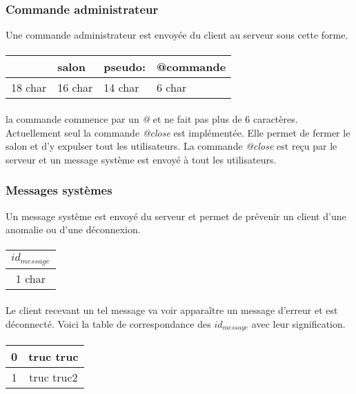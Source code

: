 \documentclass[a4paper, 12pt]{article}
\begin{document}
\subsubsection{Commande administrateur}
Une commande administrateur est envoyée du client au serveur sous cette forme.
\paragraph{}
\begin{tabular}{|p{2cm}|p{1.6cm}|p{1.5cm}|p{5cm}| }
 \hline			
   [hh:mm:ss] & salon & pseudo: & @commande \\
 \hline		
    18 char & 16 char & 14 char & 6 char \\
 \hline  
 \end{tabular}
 \paragraph{}
la commande commence par un \emph{@} et ne fait pas plus de 6 caractères.
Actuellement seul la commande \emph{@close} est implémentée. Elle permet de fermer le salon et d'y expulser tout les utilisateurs.
La commande \emph{@close} est reçu par le serveur et un message système est envoyé à tout les utilisateurs.
\subsubsection{Messages systèmes}
Un message système est envoyé du serveur et permet de prévenir un client d'une anomalie ou d'une déconnexion.
\paragraph{}
\begin{tabular}{|c|}
 \hline			
   $id_{message}$\\
 \hline		
    1 char \\
 \hline  
 \end{tabular}
\paragraph{}
Le client recevant un tel message va voir apparaître un message d'erreur et est déconnecté.
Voici la table de correspondance des $id_{message}$ avec leur signification.
\paragraph{}
\begin{tabular}{|c|c|}
 \hline		
    0 & truc truc \\
 \hline  
 	1 & truc truc2 \\
 \hline
 \end{tabular}
\end{document}
